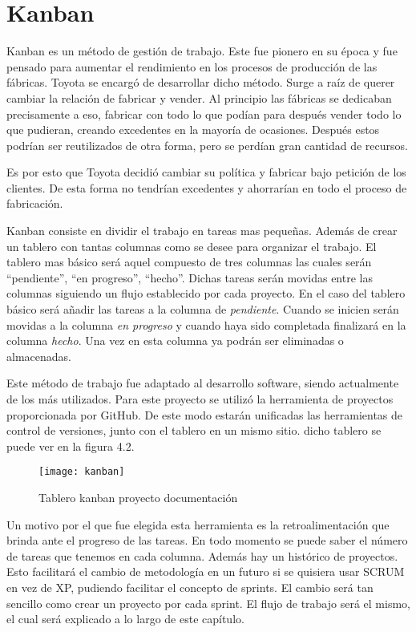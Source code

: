 \section{Kanban}

Kanban es un método de gestión de trabajo. Este fue pionero en su época y fue pensado para
aumentar el rendimiento en los procesos de producción de las fábricas. Toyota se encargó
de desarrollar dicho método. Surge a raíz de querer cambiar la relación de fabricar y vender.
Al principio las fábricas se dedicaban precisamente a eso, fabricar con todo lo que podían
para después vender todo lo que pudieran, creando excedentes en la mayoría de ocasiones. Después
estos podrían ser reutilizados de otra forma, pero se perdían gran cantidad de recursos.

Es por esto que Toyota decidió cambiar su política y fabricar bajo petición de los clientes. De
esta forma no tendrían excedentes y ahorrarían en todo el proceso de fabricación.

Kanban consiste en dividir el trabajo en tareas mas pequeñas. Además de crear un tablero
con tantas columnas como se desee para organizar el trabajo.
El tablero mas básico será aquel compuesto de tres columnas las cuales serán \enquote{pendiente},
\enquote{en progreso}, \enquote{hecho}. Dichas tareas serán movidas entre las columnas siguiendo un flujo
establecido por cada proyecto. En el caso del tablero básico será añadir las tareas a la columna
de \textit{pendiente}. Cuando se inicien serán movidas a la columna \textit{en progreso} y cuando haya sido completada
finalizará en la columna \textit{hecho}. Una vez en esta columna ya podrán ser eliminadas o
almacenadas.

Este método de trabajo fue adaptado al desarrollo software, siendo actualmente de los más utilizados.
Para este proyecto se utilizó la herramienta de proyectos proporcionada por GitHub. De este modo
estarán unificadas las herramientas de control de versiones, junto con el tablero en un mismo sitio.
dicho tablero se puede ver en la figura 4.2.

\begin{figure}[htb]
  \centering
    \texttt{[image: kanban]}
  \caption[Tablero kanban proyecto documentación]{Tablero kanban proyecto documentación}
  \label{fig:Tablero kanban proyecto documentación}
\end{figure}

Un motivo por el que fue elegida esta herramienta es la retroalimentación que brinda ante
el progreso de las tareas. En todo momento se puede saber el número de tareas que tenemos
en cada columna. Además hay un histórico de proyectos. Esto facilitará el cambio de metodología
en un futuro si se quisiera usar SCRUM en vez de XP, pudiendo facilitar
el concepto de sprints. El cambio será tan sencillo como crear un proyecto por cada sprint.
El flujo de trabajo será el mismo, el cual será explicado a lo largo de este capítulo.

